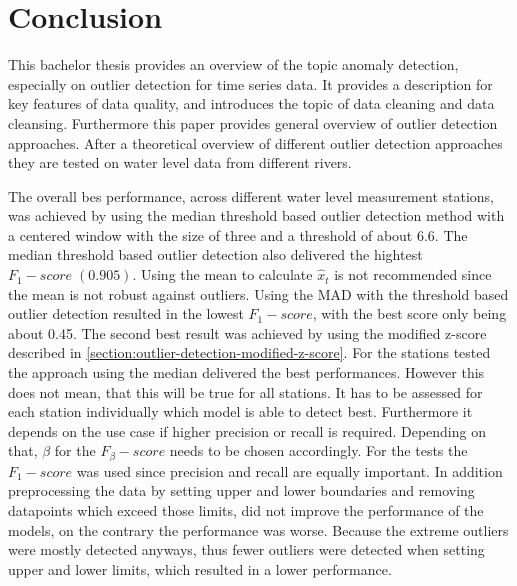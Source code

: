 \chapter{Conclusion}
This bachelor thesis provides an overview of the topic anomaly detection, especially on outlier detection for time series data. It provides a description for key features of data quality, and introduces the topic of data cleaning and data cleansing. Furthermore this paper provides general overview of outlier detection approaches. After a theoretical overview of different outlier detection approaches they are tested on water level data from different rivers.
\par
The overall bes performance, across different water level measurement stations, was achieved by using the median threshold based outlier detection method with a centered window with the size of three and a threshold of about 6.6. The median threshold based outlier detection also delivered the hightest $F_1-score\;(0.905)$. Using the mean to calculate $\hat{x}_t$ is not recommended since the mean is not robust against outliers. Using the \ac{MAD} with the threshold based outlier detection resulted in the lowest $F_1-score$, with the best score only being about 0.45. The second best result was achieved by using the modified z-score described in \autoref{section:outlier-detection-modified-z-score}. For the stations tested the approach using the median delivered the best performances. However this does not mean, that this will be true for all stations. It has to be assessed for each station individually which model is able to detect best. Furthermore it depends on the use case if higher precision or recall is required. Depending on that, $\beta$ for the $F_{\beta}-score$ needs to be chosen accordingly. For the tests the $F_1-score$ was used since precision and recall are equally important. In addition preprocessing the data by setting upper and lower boundaries and removing datapoints which exceed those limits, did not improve the performance of the models, on the contrary the performance was worse. Because the extreme outliers were mostly detected anyways, thus fewer outliers were detected when setting upper and lower limits, which resulted in a lower performance.

